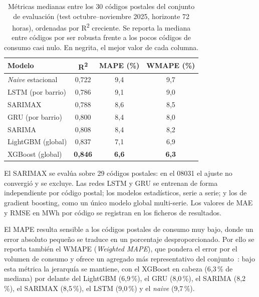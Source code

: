 \documentclass[12pt, a4paper]{article}
\begin{document}
\begin{table}[H]
\centering
\caption{Métricas medianas entre los 30 códigos postales del conjunto de evaluación (test octubre--noviembre 2025, horizonte 72 horas), ordenadas por R\textsuperscript{2} creciente. Se reporta la mediana entre códigos por ser robusta frente a los pocos códigos de consumo casi nulo. En negrita, el mejor valor de cada columna.}
\label{tab:comparativa}
\begin{tabular}{lccc}
\toprule
Modelo & R\textsuperscript{2} & MAPE (\%) & WMAPE (\%) \\
\midrule
\textit{Naive} estacional & 0,722 & 9,4 & 9,7 \\
LSTM (por barrio) & 0,786 & 9,1 & 9,0 \\
SARIMAX & 0,788 & 8,6 & 8,5 \\
GRU (por barrio) & 0,800 & 8,4 & 8,0 \\
SARIMA & 0,808 & 8,4 & 8,2 \\
LightGBM (global) & 0,837 & 7,1 & 6,9 \\
XGBoost (global) & \textbf{0,846} & \textbf{6,6} & \textbf{6,3} \\
\bottomrule
\end{tabular}

\vspace{4pt}
{\footnotesize\raggedright El SARIMAX se evalúa sobre 29 códigos postales: en el 08031 el ajuste no convergió y se excluye. Las redes LSTM y GRU se entrenan de forma independiente por código postal; los modelos estadísticos, serie a serie; y los de gradient boosting, como un único modelo global multi-serie. Los valores de MAE y RMSE en MWh por código se registran en los ficheros de resultados.\par}
\end{table}

El MAPE resulta sensible a los códigos postales de consumo muy bajo, donde un error absoluto pequeño se traduce en un porcentaje desproporcionado. Por ello se reporta también el WMAPE (\textit{Weighted MAPE}), que pondera el error por el volumen de consumo y ofrece un agregado más representativo del conjunto~\cite{hyndman2021}: bajo esta métrica la jerarquía se mantiene, con el XGBoost en cabeza (6,3\,\% de mediana) por delante del LightGBM (6,9\,\%), el GRU (8,0\,\%), el SARIMA (8,2\,\%), el SARIMAX (8,5\,\%), el LSTM (9,0\,\%) y el \textit{naive} (9,7\,\%).
\end{document}
